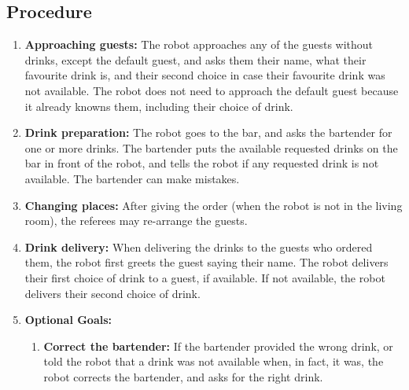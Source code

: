 \subsection*{Procedure}
\begin{enumerate}[nosep]
	\item \textbf{Approaching guests:} The robot approaches any of the guests without drinks, except the default guest,  and asks them their name, what their favourite drink is, and their second choice in case their favourite drink was not available. The robot does not need to approach the default guest because it already knowns them, including their choice of drink.
	
	\item \textbf{Drink preparation:} The robot goes to the bar, and asks the bartender for one or more drinks. The bartender puts the available requested drinks on the bar in front of the robot, and tells the robot if any requested drink is not available. The bartender can make mistakes.
	
	\item \textbf{Changing places:} After giving the order (when the robot is not in the living room), the referees may re-arrange the guests.

	
	\item \textbf{Drink delivery:} When delivering the drinks to the guests who ordered them, the robot first greets the guest saying their name. The robot delivers their first choice of drink to a guest, if available. If not available, the robot delivers their second choice of drink. 

	\item \textbf{Optional Goals:}
	\begin{enumerate}
	 \item \textbf{Correct the bartender:} If the bartender provided the wrong drink, or told the robot that a drink was not available when, in fact, it was, the robot corrects the bartender, and asks for the right drink.
	\end{enumerate}

	
\end{enumerate}


